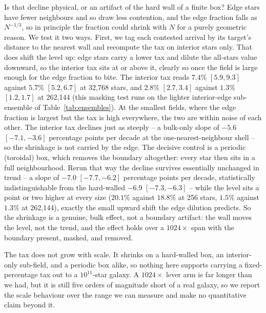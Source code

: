 Is that decline physical, or an artifact of the hard wall of a finite box? Edge stars have fewer
neighbours and so draw less contention, and the edge fraction falls as $N^{-1/3}$, so in principle
the fraction could shrink with $N$ for a purely geometric reason. We test it two ways. First, we tag each contested arrival by its target's distance to the nearest wall
and recompute the tax on interior stars only. That does shift the level up: edge stars carry a lower
tax and dilute the all-stars value downward, so the interior tax sits at or above it, clearly so
once the field is large enough for the edge fraction to bite. The interior tax reads $7.4\%$
$[5.9, 9.3]$ against $5.7\%$ $[5.2, 6.7]$ at 32{,}768 stars, and $2.8\%$ $[2.7, 3.4]$ against
$1.3\%$ $[1.2, 1.7]$ at 262{,}144 (this masking test runs on the lighter interior-edge sub-ensemble
of Table~\ref{tab:ensembles}). At the smallest fields, where the edge fraction is largest but the
tax is high everywhere, the two are within noise of each other. The interior tax declines just as steeply -- a bulk-only slope of $-5.6$
$[-7.1, -3.6]$ percentage points per decade at the one-nearest-neighbour shell -- so
the shrinkage is not carried by the edge. The decisive control is a periodic (toroidal) box, which
removes the boundary altogether: every star then sits in a full neighbourhood. Rerun that way the
decline survives essentially unchanged in trend -- a slope of $-7.0$ $[-7.7, -6.2]$ percentage points
per decade, statistically indistinguishable from the hard-walled $-6.9$ $[-7.3, -6.3]$ -- while the
level sits a point or two higher at every size ($20.1\%$ against $18.8\%$ at 256 stars, $1.5\%$
against $1.3\%$ at 262{,}144), exactly the small upward shift the edge dilution predicts. So the
shrinkage is a genuine, bulk effect, not a boundary artifact: the wall moves the level, not the
trend, and the effect holds over a $1024\times$ span with the boundary present, masked, and removed.

The tax does not grow with scale. It shrinks on a hard-walled box, an interior-only sub-field,
and a periodic box alike, so nothing here supports carrying a fixed-percentage tax out
to a $10^{11}$-star galaxy. A $1024\times$ lever arm is far longer than we had, but it is still five
orders of magnitude short of a real galaxy, so we report the scale behaviour over the range we can
measure and make no quantitative claim beyond it.

